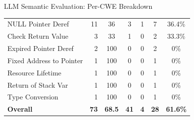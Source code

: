\documentclass[aspectratio=169,10pt]{beamer}
\newcommand{\chit}[1]{\cellcolor{hit!30} #1}
\newcommand{\cmiss}[1]{\cellcolor{miss!25} #1}
\newcommand{\cwarn}[1]{\cellcolor{warn!30} #1}
\begin{document}
\begin{frame}{LLM Semantic Evaluation: Per-CWE Breakdown}
{\begin{tabular}{l r c c c c c}
    NULL Pointer Deref         & 11 & \cmiss{36}  & 3 & 1 & 7 & \cmiss{36.4\%} \\
    \rowcolor{miss!8}
    Check Return Value         & 3  & \cwarn{33}  & 1 & 0 & 2 & \cmiss{33.3\%} \\
    \rowcolor{miss!8}
    Expired Pointer Deref      & 2  & \chit{100}  & 0 & 0 & 2 & \cmiss{0\%} \\
    \rowcolor{miss!8}
    Fixed Address to Pointer   & 1  & \chit{100}  & 0 & 0 & 1 & \cmiss{0\%} \\
    \rowcolor{miss!8}
    Resource Lifetime          & 1  & \chit{100}  & 0 & 0 & 1 & \cmiss{0\%} \\
    \rowcolor{miss!8}
    Return of Stack Var        & 1  & \chit{100}  & 0 & 0 & 1 & \cmiss{0\%} \\
    \rowcolor{miss!8}
    Type Conversion            & 1  & \chit{100}  & 0 & 0 & 1 & \cmiss{0\%} \\
    \midrule
    \rowcolor{c1!8}
    \textbf{Overall}           & \textbf{73} & \textbf{68.5} & \textbf{41} & \textbf{4} & \textbf{28} & \textbf{61.6\%} \\
    \bottomrule
  \end{tabular}}

\end{frame}
\end{document}
